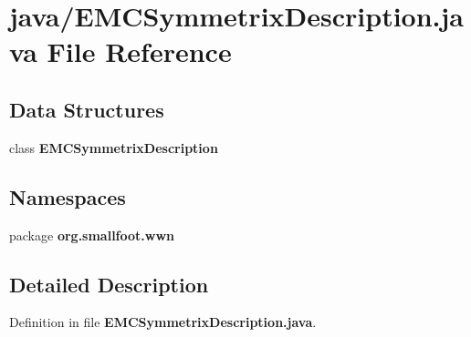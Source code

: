 \section{java/\-E\-M\-C\-Symmetrix\-Description.java \-File \-Reference}
\label{EMCSymmetrixDescription_8java}
\subsection*{\-Data \-Structures}
\begin{DoxyCompactItemize}
\item 
class {\bf \-E\-M\-C\-Symmetrix\-Description}
\end{DoxyCompactItemize}
\subsection*{\-Namespaces}
\begin{DoxyCompactItemize}
\item 
package {\bf org.\-smallfoot.\-wwn}
\end{DoxyCompactItemize}


\subsection{\-Detailed \-Description}


\-Definition in file {\bf \-E\-M\-C\-Symmetrix\-Description.\-java}.

